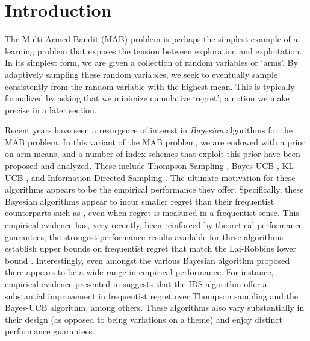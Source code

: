 \section{Introduction} \label{sec:intro}


The Multi-Armed Bandit (MAB) problem is perhaps the simplest example of a learning problem that exposes the tension between exploration and exploitation. In its simplest form, we are given a collection of random variables or `arms'. By adaptively sampling these random variables, we seek to eventually sample consistently from the random variable with the highest mean. This is typically formalized by asking that we minimize cumulative `regret'; a notion we make precise in a later section. 

Recent years have seen a resurgence of interest in {\em Bayesian} algorithms for the MAB problem. In this variant of the MAB problem, we are endowed with a prior on arm means, and a number of index schemes that exploit this prior have been proposed and analyzed. These include Thompson Sampling \citep{thompson1933likelihood}, Bayes-UCB \citep{kaufmann2012thompson}, KL-UCB \citep{garivier2011kl}, and Information Directed Sampling \citep{russo2014learning}. The ultimate motivation for these algorithms appears to be the empirical performance they offer. Specifically, these Bayesian algorithms appear to incur smaller regret than their frequentist counterparts such as \cite{UCB?}, even when regret is measured in a frequentist sense. This empirical evidence has, very recently, been reinforced by theoretical performance guarantees; the strongest performance results available for these algorithms establish upper bounds on frequentist regret that match the Lai-Robbins lower bound \citep{lai1985asymptotically}. Interestingly, even amongst the various Bayesian algorithm proposed there appears to be a wide range in empirical performance. For instance, empirical evidence presented in \cite{russo2014learning} suggests that the IDS algorithm offer a substantial improvement in frequentist regret over Thompson sampling and the Bayes-UCB algorithm, among others. These algorithms also vary substantially in their design (as opposed to being variations on a theme) and enjoy distinct performance guarantees.    

